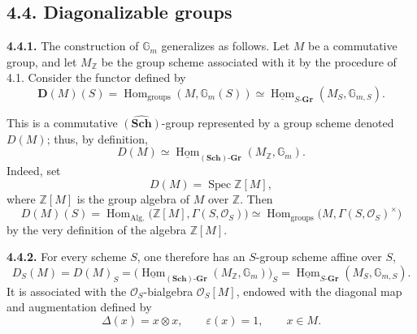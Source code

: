 
\subsection*{4.4. Diagonalizable groups}

\medskip
\noindent\textbf{4.4.1.}
The construction of \(\mathbb G_m\) generalizes as follows. Let \(M\)
be a commutative group, and let \(M_{\mathbb Z}\) be the group scheme
associated with it by the procedure of 4.1. Consider the functor defined
by
\[
  \mathbf D(M)(S)
    =\operatorname{Hom}_{\mathrm{groups}}(M,\mathbb G_m(S))
    \simeq
      \underline{\operatorname{Hom}}_{S\text{-}\mathbf{Gr}}
        (M_S,\mathbb G_{m,S}).
\]

This is a commutative \(\widehat{(\mathbf{Sch})}\)-group represented by a
group scheme denoted \(D(M)\); thus, by definition,
\[
  D(M)\simeq
  \underline{\operatorname{Hom}}_{(\mathbf{Sch})\text{-}\mathbf{Gr}}
    (M_{\mathbb Z},\mathbb G_m).
\]
Indeed, set
\[
  D(M)=\operatorname{Spec}\mathbb Z[M],
\]
where \(\mathbb Z[M]\) is the group algebra of \(M\) over \(\mathbb Z\).
Then
\[
  D(M)(S)
    =\operatorname{Hom}_{\mathrm{Alg.}}
       \bigl(\mathbb Z[M],\Gamma(S,\mathcal O_S)\bigr)
    \simeq
      \operatorname{Hom}_{\mathrm{groups}}
       \bigl(M,\Gamma(S,\mathcal O_S)^{\times}\bigr)
\]
by the very definition of the algebra \(\mathbb Z[M]\).

\medskip
\noindent\textbf{4.4.2.}
For every scheme \(S\), one therefore has an \(S\)-group scheme affine
over \(S\),
\[
  D_S(M)=D(M)_S
    =\bigl(
      \underline{\operatorname{Hom}}_{(\mathbf{Sch})\text{-}\mathbf{Gr}}
        (M_{\mathbb Z},\mathbb G_m)
      \bigr)_S
    =\underline{\operatorname{Hom}}_{S\text{-}\mathbf{Gr}}
       (M_S,\mathbb G_{m,S}).
\]
It is associated with the \(\mathcal O_S\)-bialgebra
\(\mathcal O_S[M]\), endowed with the diagonal map and augmentation
defined by
\[
  \Delta(x)=x\otimes x,
  \qquad
  \varepsilon(x)=1,
  \qquad x\in M.
\]

